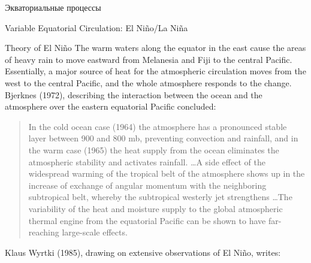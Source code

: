 \begin{chapter}{Экваториальные процессы}
\begin{section}{Variable Equatorial Circulation: El Ni\~{n}o/La Ni\~{n}a}
\begin{paragraph}{Theory of El Ni\~{n}o}
The warm waters along the equator in the east cause the areas of heavy
rain to move eastward from Melanesia and Fiji to the central
Pacific. Essentially, a major source of heat for the atmospheric
circulation moves from the west to the central Pacific, and the whole
atmosphere responds to the change. Bjerknes (1972), describing the
interaction between the ocean and the atmosphere over the eastern
equatorial Pacific concluded:
%
\begin{quote}
In the cold ocean case (1964) the atmosphere has a pronounced stable
layer between 900 and 800 mb, preventing convection and
rainfall, and in the warm case (1965)
the heat supply from the ocean eliminates the atmospheric stability
and activates rainfall. \ldots A side effect of the widespread warming
of the tropical belt of the atmosphere shows up in the increase of
exchange of angular momentum with the neighboring subtropical belt,
whereby the subtropical westerly jet strengthens \ldots The
variability of the heat and moisture supply to the global atmospheric
thermal engine from the equatorial Pacific can be shown to have
far-reaching large-scale effects.
%
\end{quote}
Klaus Wyrtki (1985), drawing on extensive observations of El Ni\~{n}o,
writes:
%
%
\begin{quote}

\end{quote}
\end{paragraph}
\end{section}
\end{chapter}
